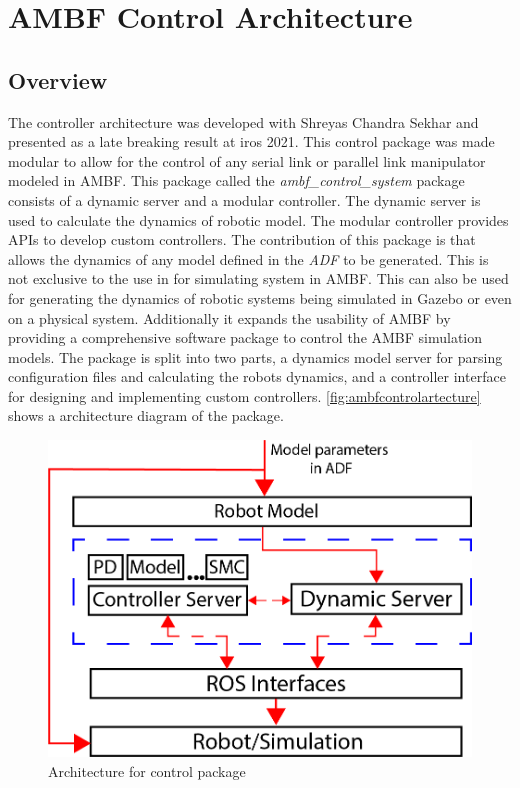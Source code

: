  
 
 \section{AMBF Control Architecture}
 \label{sec:controlarchitecture}
 
 \subsection{Overview}
 The controller architecture was developed with Shreyas Chandra Sekhar and presented as a late breaking result at iros 2021. This control package was made modular to allow for the control of any serial link or parallel link manipulator modeled in AMBF. This package called the \textit{ambf\_control\_system} package consists of a dynamic server and a modular controller. The dynamic server is used to calculate the dynamics of robotic model. The modular controller provides APIs to develop custom controllers. The contribution of this package is that allows the dynamics  of any model defined in the \textit{ADF} to be generated. This is not exclusive to the use in for simulating system in AMBF. This can also be used for generating the dynamics of robotic systems being simulated in Gazebo \cite{koenig2004design} or even on a physical system. Additionally it expands the usability of AMBF by providing a comprehensive software package to control the AMBF simulation models. The package is split into two parts, a dynamics model server for parsing configuration files and calculating the robots dynamics, and a controller interface for designing and implementing custom controllers. \autoref{fig:ambfcontrolartecture} shows a architecture diagram of the package. 
 

 \begin{figure}
     \centering
     \includegraphics[scale=1.5]{images/software/dynamic_server_daigram.png}
     \caption[Controller package Diagram]{Architecture for control package}
     \label{fig:ambfcontrolartecture}
 \end{figure}
 
